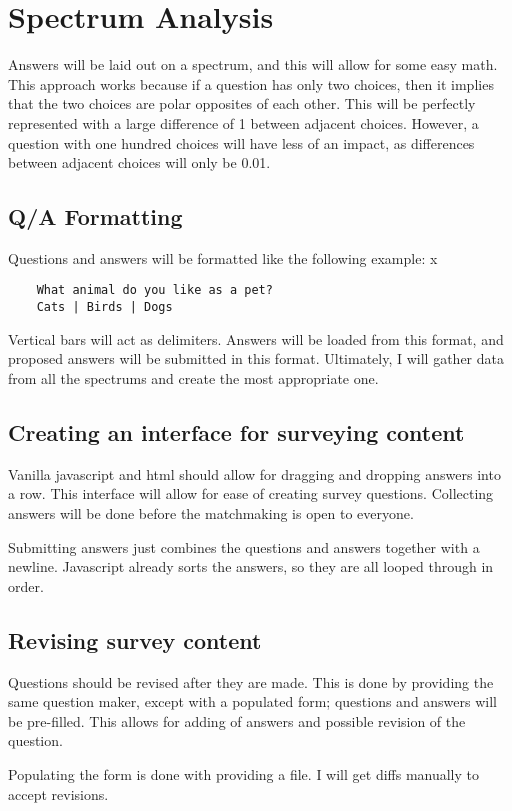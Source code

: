 \documentclass[12pt]{article}
\begin{document}
\section{Spectrum Analysis}
Answers will be laid out on a spectrum, and this will allow for some easy math. This approach works because if a question has only two choices, then it implies that the two choices are polar opposites of each other. This will be perfectly represented with a large difference of 1 between adjacent choices. However, a question with one hundred choices will have less of an impact, as differences between adjacent choices will only be 0.01.

\subsection{Q/A Formatting}
Questions and answers will be formatted like the following example:
x
\begin{verbatim}
    What animal do you like as a pet?
    Cats | Birds | Dogs
\end{verbatim}

Vertical bars will act as delimiters. Answers will be loaded from this format, and proposed answers will be submitted in this format. Ultimately, I will gather data from all the spectrums and create the most appropriate one.

\subsection{Creating an interface for surveying content}
Vanilla javascript and html should allow for dragging and dropping answers into a row. This interface will allow for ease of creating survey questions. Collecting answers will be done before the matchmaking is open to everyone.

Submitting answers just combines the questions and answers together with a newline. Javascript already sorts the answers, so they are all looped through in order.

\subsection{Revising survey content}
Questions should be revised after they are made. This is done by providing the same question maker, except with a populated form; questions and answers will be pre-filled. This allows for adding of answers and possible revision of the question.

Populating the form is done with providing a file. I will get diffs manually to accept revisions.
\end{document}
